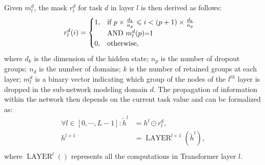 \documentclass[11pt]{article}
\begin{document}
Given $m_l^d$, the mask $r_l^d$ for task $d$ in layer $l$ is then derived as follows:
\begin{align*}
  r_l^d(i) &= \begin{cases}
    1, & \text{if}\ p \times \frac{d_k}{n_p} \leqslant i < (p+1) \times \frac{d_k}{n_p} \\
    & \text{AND} \  m_l^d(p) \text{\small =} 1 \\
    0, & \text{otherwise},
  \end{cases} 
\end{align*}
where $d_k$ is the dimension of the hidden state; $n_p$ is the number of dropout groups; $n_d$ is the number of domains; $k$ is the number of retained groups at each layer; $m_l^d$ is a binary vector indicating which group of the nodes of the $l^{th}$ layer is dropped in the sub-network modeling domain $d$. The propagation of information within the network then depends on the current task value and can be formalized as:
\begin{align*}
  \forall l \in [0,\cdots, L-1]: \tilde{h}^l &= h^l \odot r_l^d ,\\
  h^{l+1} &= \operatorname{LAYER}^{l+1}(\tilde{h}^l) ,\\
\end{align*}
where $\operatorname{LAYER}^l()$ represents all the computations in Transformer layer $l$. 
\end{document}

